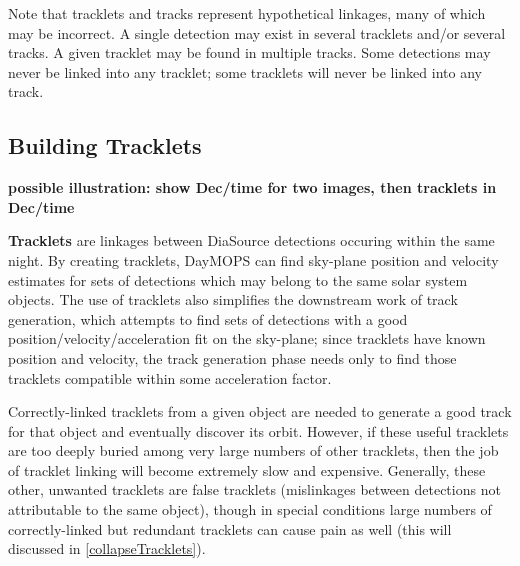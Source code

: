 Note that tracklets and tracks represent hypothetical linkages, many
of which may be incorrect.  A single detection may exist in several
tracklets and/or several tracks.  A given tracklet may be found in
multiple tracks.  Some detections may never be linked into any
tracklet; some tracklets will never be linked into any track.  





\subsection{Building Tracklets}

\textbf{ possible illustration: show Dec/time for two images, then tracklets in Dec/time}

\textbf{Tracklets} are linkages between DiaSource detections occuring
within the same night. By creating tracklets, DayMOPS can find
sky-plane position and velocity estimates for sets of detections which
may belong to the same solar system objects.  The use of tracklets
also simplifies the downstream work of track generation, which
attempts to find sets of detections with a good
position/velocity/acceleration fit on the sky-plane; since tracklets
have known position and velocity, the track generation phase needs
only to find those tracklets compatible within some acceleration
factor.

Correctly-linked tracklets from a given object are needed to generate
a good track for that object and eventually discover its orbit.
However, if these useful tracklets are too deeply buried among very
large numbers of other tracklets, then the job of tracklet linking
will become extremely slow and expensive.  Generally, these other,
unwanted tracklets are false tracklets (mislinkages between detections
not attributable to the same object), though in special conditions
large numbers of correctly-linked but redundant tracklets can cause
pain as well (this will discussed in \ref{collapseTracklets}).

